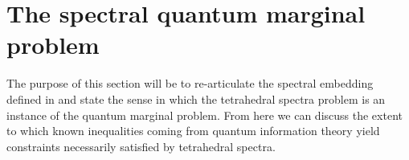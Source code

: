 \documentclass[notitlepage, 10pt]{article}
\begin{document}
%


\clearpage
\section{The spectral quantum marginal problem}
{\color{blue}
    The purpose of this section will be to re-articulate the spectral embedding defined in \cite{christandl2018recoupling} and state the sense in which the tetrahedral spectra problem is an instance of the quantum marginal problem.
    From here we can discuss the extent to which known inequalities coming from quantum information theory yield constraints necessarily satisfied by tetrahedral spectra.
}
\end{document}

